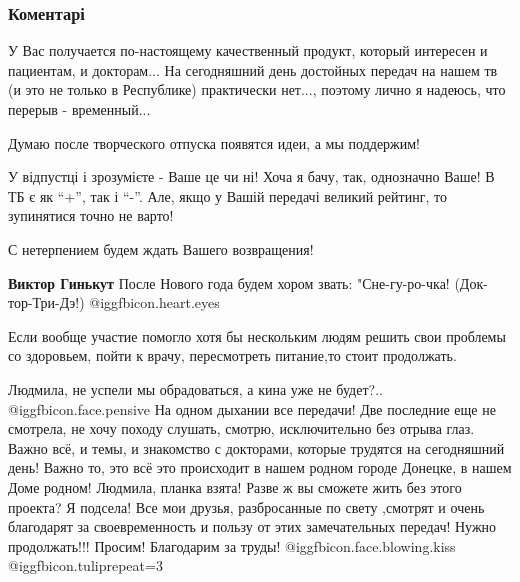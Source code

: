  
 
 
 
 
\subsubsection{Коментарі}
\label{sec:16_11_2021.fb.denisenko_ljudmila.doneck.1.teleperedacha.cmt}

\begin{itemize} %

У Вас получается по-настоящему качественный продукт, который интересен и
пациентам, и докторам... На сегодняшний день достойных передач на нашем тв (и
это не только в Республике) практически нет..., поэтому лично я надеюсь, что
перерыв - временный...

Думаю после творческого отпуска появятся идеи, а мы поддержим!


У відпустці і зрозумієте - Ваше це чи ні! Хоча я бачу, так, однозначно Ваше! В
ТБ є як \enquote{+}, так і \enquote{-}. Але, якщо у Вашій передачі великий рейтинг, то
зупинятися точно не варто!

С нетерпением будем ждать Вашего возвращения!

\begin{itemize} %
\textbf{Виктор Гинькут} После Нового года будем хором звать: "Сне-гу-ро-чка! (Док-тор-Три-Дэ!)  @igg{fbicon.heart.eyes} 
\end{itemize} %

Если вообще участие помогло хотя бы нескольким людям решить свои проблемы со здоровьем, пойти к врачу, пересмотреть питание,то стоит продолжать.


Людмила, не успели мы обрадоваться, а кина уже не будет?..  @igg{fbicon.face.pensive}  На одном дыхании
все передачи! Две последние еще не смотрела, не хочу походу слушать, смотрю,
исключительно без отрыва глаз. Важно всё, и темы, и знакомство с докторами,
которые трудятся на сегодняшний день! Важно то, это всё это происходит в нашем
родном городе Донецке, в нашем Доме родном! Людмила, планка взята! Разве ж вы
сможете жить без этого проекта? Я подсела! Все мои друзья, разбросанные по
свету ,смотрят и очень благодарят за своевременность и пользу от этих
замечательных передач! Нужно продолжать!!! Просим! Благодарим за труды!
 @igg{fbicon.face.blowing.kiss}  @igg{fbicon.tulip}{repeat=3} 


\end{itemize}
